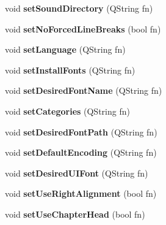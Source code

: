 \begin{DoxyCompactItemize}
\item 
\hypertarget{classConfig_a679e76e920aa53e67bde7cda6cd7356a}{
void {\bfseries setSoundDirectory} (QString fn)}
\label{classConfig_a679e76e920aa53e67bde7cda6cd7356a}

\item 
\hypertarget{classConfig_a775dfb23e90e1620e39af94e3b70dc69}{
void {\bfseries setNoForcedLineBreaks} (bool fn)}
\label{classConfig_a775dfb23e90e1620e39af94e3b70dc69}

\item 
\hypertarget{classConfig_aaa7a9747725a99a8cc67f0f3cbbfd7de}{
void {\bfseries setLanguage} (QString fn)}
\label{classConfig_aaa7a9747725a99a8cc67f0f3cbbfd7de}

\item 
\hypertarget{classConfig_af14f17e898c0cac9459b2a74d65b66a2}{
void {\bfseries setInstallFonts} (QString fn)}
\label{classConfig_af14f17e898c0cac9459b2a74d65b66a2}

\item 
\hypertarget{classConfig_a649288329caf696e5307160b577ce2d5}{
void {\bfseries setDesiredFontName} (QString fn)}
\label{classConfig_a649288329caf696e5307160b577ce2d5}

\item 
\hypertarget{classConfig_aa69da2760d3e0216b74f2035133a6e75}{
void {\bfseries setCategories} (QString fn)}
\label{classConfig_aa69da2760d3e0216b74f2035133a6e75}

\item 
\hypertarget{classConfig_ac0a7f8843703be9824973538506e2092}{
void {\bfseries setDesiredFontPath} (QString fn)}
\label{classConfig_ac0a7f8843703be9824973538506e2092}

\item 
\hypertarget{classConfig_a3983eb93f9cd62a4ab7296f7d3f2652b}{
void {\bfseries setDefaultEncoding} (QString fn)}
\label{classConfig_a3983eb93f9cd62a4ab7296f7d3f2652b}

\item 
\hypertarget{classConfig_af34d507b3533ab833d68994900a2b3dc}{
void {\bfseries setDesiredUIFont} (QString fn)}
\label{classConfig_af34d507b3533ab833d68994900a2b3dc}

\item 
\hypertarget{classConfig_a704a986ae96439559c55eeaa12b7aeb0}{
void {\bfseries setUseRightAlignment} (bool fn)}
\label{classConfig_a704a986ae96439559c55eeaa12b7aeb0}

\item 
\hypertarget{classConfig_ad57a8bde0b3a92840f341f1f902ff19c}{
void {\bfseries setUseChapterHead} (bool fn)}
\label{classConfig_ad57a8bde0b3a92840f341f1f902ff19c}


\end{DoxyCompactItemize}
